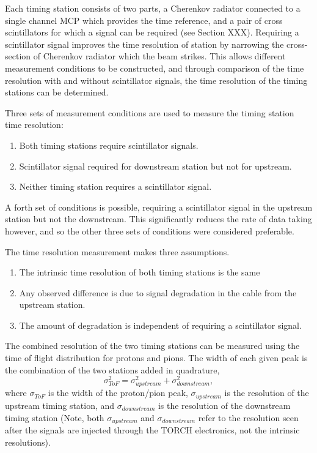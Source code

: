 Each timing station consists of two parts, a Cherenkov radiator connected to a single channel MCP which provides the time reference, and a pair of cross scintillators for which a signal can be required (see Section XXX). 
Requiring a scintillator signal improves the time resolution of station by narrowing the cross-section of Cherenkov radiator which the beam strikes. This allows different measurement conditions to be constructed, and through comparison of the time resolution with and without scintillator signals, the time resolution of the timing stations can be determined.

Three sets of measurement conditions are used to measure the timing station time resolution:
\begin{enumerate}
\item Both timing stations require scintillator signals.
\item Scintillator signal required for downstream station but not for upstream.
\item Neither timing station requires a scintillator signal.
\end{enumerate}
A forth set of conditions is possible, requiring a scintillator signal in the upstream station but not the downstream. This significantly reduces the rate of data taking however, and so the other three sets of conditions were considered preferable.

The time resolution measurement makes three assumptions.
\begin{enumerate}
\item The intrinsic time resolution of both timing stations is the same
\item Any observed difference is due to signal degradation in the cable from the upstream station.
\item The amount of degradation is independent of requiring a scintillator signal.
\end{enumerate}

The combined resolution of the two timing stations can be measured using the time of flight distribution for protons and pions. The width of each given peak is the combination of the two stations added in quadrature,
\begin{equation}
\label{eqn:TORCH_ToFResolution}
\sigma_{ToF}^{2} = \sigma_{upstream}^{2} + \sigma_{downstream}^{2},
\end{equation}
where $\sigma_{ToF}$ is the width of the proton/pion peak, $\sigma_{upstream}$ is the resolution of the upstream timing station, and $\sigma_{downstream}$ is the resolution of the downstream timing station (Note, both $\sigma_{upstream}$ and $\sigma_{downstream}$ refer to the resolution seen after the signals are injected through the TORCH electronics, not the intrinsic resolutions).

